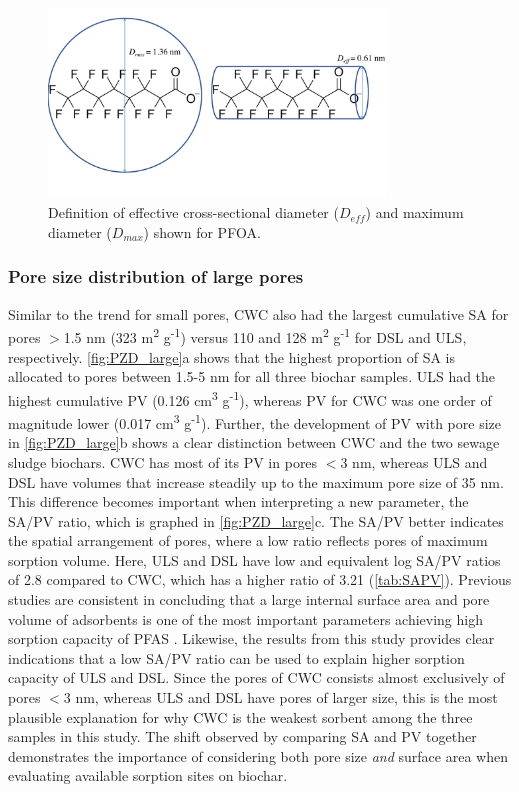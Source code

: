 \begin{figure}
    \centering
    \includegraphics[width=0.8\textwidth, trim={0 2cm 0 0},clip]{Diagrams/Molecular_size.pdf}
    \caption{Definition of effective cross-sectional diameter ($D_{eff}$) and maximum diameter ($D_{max}$) shown for PFOA.}
    \label{fig:molecularSize}
\end{figure}

\subsubsection{Pore size distribution of large pores}
Similar to the trend for small pores, CWC also had the largest cumulative SA for pores $>$1.5 nm (323 m\textsuperscript{2} g\textsuperscript{-1}) versus 110 and 128 m\textsuperscript{2} g\textsuperscript{-1} for DSL and ULS, respectively. \cref{fig:PZD_large}a shows that the highest proportion of SA is allocated to pores between 1.5-5 nm for all three biochar samples. ULS had the highest cumulative PV (0.126 cm\textsuperscript{3} g\textsuperscript{-1}), whereas PV for CWC was one order of magnitude lower (0.017 cm\textsuperscript{3} g\textsuperscript{-1}). Further, the development of PV with pore size in \cref{fig:PZD_large}b shows a clear distinction between CWC and the two sewage sludge biochars. CWC has most of its PV in pores $<$3 nm, whereas ULS and DSL have volumes that increase steadily up to the maximum pore size of 35 nm. This difference becomes important when interpreting a new parameter, the SA/PV ratio, which is graphed in \cref{fig:PZD_large}c. The SA/PV better indicates the spatial arrangement of pores, where a low ratio reflects pores of maximum sorption volume. Here, ULS and DSL have low and equivalent log SA/PV ratios of 2.8 compared to CWC, which has a higher ratio of 3.21 (\cref{tab:SAPV}). Previous studies are consistent in concluding that a large internal surface area and pore volume of adsorbents is one of the most important parameters achieving high sorption capacity of PFAS \citep{du2014adsorption,Sormo2021,Hale2016,ahmed2020per}. Likewise, the results from this study provides clear indications that a low SA/PV ratio can be used to explain higher sorption capacity of ULS and DSL. Since the pores of CWC consists almost exclusively of pores $<$3 nm, whereas ULS and DSL have pores of larger size, this is the most plausible explanation for why CWC is the weakest sorbent among the three samples in this study. The shift observed by comparing SA and PV together demonstrates the importance of considering both pore size \textit{and} surface area when evaluating available sorption sites on biochar.

